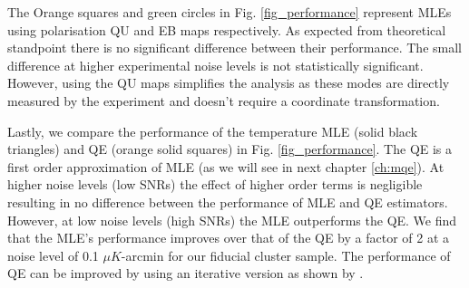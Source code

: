  The Orange squares and green circles in Fig. \ref{fig_performance} represent MLEs using polarisation QU and EB maps respectively. 
 As expected from theoretical standpoint there is no significant difference between their performance.
 The small difference at higher experimental noise levels is not statistically significant.
 However, using the QU maps simplifies the analysis as these modes are directly measured by the experiment and doesn't require a coordinate transformation. %
 
  
 Lastly, we compare the performance of the temperature MLE (solid black triangles) and QE (orange solid squares) in Fig. \ref{fig_performance}. 
 The QE is a first order approximation of MLE (as we will see in next chapter \ref{ch:mqe}).
 At higher noise levels (low SNRs) the effect of higher order terms is negligible resulting in no difference between the performance of MLE and QE estimators.
 However, at low noise levels (high SNRs) the MLE outperforms the QE. We find that the MLE's performance improves over that of the QE by a factor of 2 at a noise level of 0.1 $\mu K$-arcmin for our fiducial cluster sample. 
 The performance of QE can be improved by using an iterative version as shown by \cite{yoo08}.
  

